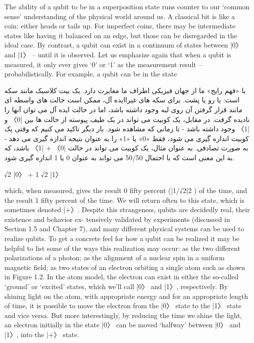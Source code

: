 \documentclass{book}
\begin{document}
The ability of a qubit to be in a superposition state runs counter to our ‘common sense’
understanding of the physical world around us. A classical bit is like a coin: either heads
or tails up. For imperfect coins, there may be intermediate states like having it balanced
on an edge, but those can be disregarded in the ideal case. By contrast, a qubit can exist
in a continuum of states between |0〉 and |1〉 – until it is observed. Let us emphasize
again that when a qubit is measured, it only ever gives ‘0’ or ‘1’ as the measurement
result – probabilistically. For example, a qubit can be in the state


با «فهم رایج» ما از جهان فیزیکی اطراف ما مغایرت دارد. یک بیت کلاسیک مانند سکه است: یا رو یا پشت. برای سکه های غیراایده آل، ممکن است حالت های واسطه ای مانند قرار گرفتن آن روی لبه وجود داشته باشد، اما در حالت ایده آل می توان آنها را نادیده گرفت. در مقابل، یک کوبیت می تواند در یک طیف پیوسته از حالت ها بین |0〉 و |1〉 وجود داشته باشد - تا زمانی که مشاهده شود. بار دیگر تاکید می کنیم که وقتی یک کوبیت اندازه گیری می شود، فقط «0» یا «1» را به عنوان نتیجه اندازه گیری می دهد - به صورت تصادفی. به عنوان مثال، یک کوبیت می تواند در حالت |0〉 + |1〉 باشد، که به این معنی است که با احتمال 50/50 می تواند به عنوان 0 یا 1 اندازه گیری شود.

√2 |0〉 + 1
√2 |1〉


which, when measured, gives the result 0 fifty percent (|1/√2|2 ) of the time, and the
result 1 fifty percent of the time. We will return often to this state, which is sometimes
denoted |+〉.
Despite this strangeness, qubits are decidedly real, their existence and behavior ex-
tensively validated by experiments (discussed in Section 1.5 and Chapter 7), and many
different physical systems can be used to realize qubits. To get a concrete feel for how a
qubit can be realized it may be helpful to list some of the ways this realization may occur:
as the two different polarizations of a photon; as the alignment of a nuclear spin in a
uniform magnetic field; as two states of an electron orbiting a single atom such as shown
in Figure 1.2. In the atom model, the electron can exist in either the so-called ‘ground’
or ‘excited’ states, which we’ll call |0〉 and |1〉, respectively. By shining light on the atom,
with appropriate energy and for an appropriate length of time, it is possible to move
the electron from the |0〉 state to the |1〉 state and vice versa. But more interestingly, by
reducing the time we shine the light, an electron initially in the state |0〉 can be moved
‘halfway’ between |0〉 and |1〉, into the |+〉 state.
\end{document}
